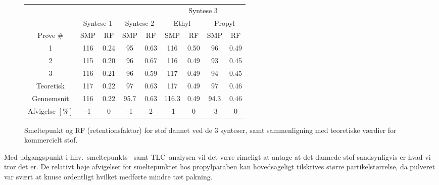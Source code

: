 \documentclass[12pt]{article}
\begin{document}
\begin{figure}[H]\centering
    \caption{Smeltepunkt og RF (retentionsfaktor) for stof dannet ved de 3 synteser, samt sammenligning med teoretiske værdier for kommercielt stof.}
    \begin{tabular*}{\linewidth}{c@{\extracolsep{\fill}}cccccccc}
        \toprule
        & & & & & \multicolumn{4}{c}{Syntese 3} \\
        \cmidrule(r){6-9}
        & \multicolumn{2}{c}{Syntese 1} & \multicolumn{2}{c}{Syntese 2} & \multicolumn{2}{c}{Ethyl} & \multicolumn{2}{c}{Propyl} \\
        \cmidrule(r){2-3} \cmidrule(r){4-5} \cmidrule(r){6-7} \cmidrule(r){8-9}
        Prøve \# & SMP & RF & SMP & RF & SMP & RF & SMP & RF \\
        \midrule
        1 & 116 & 0.24 & 95 & 0.63 & 116 & 0.50 & 96 & 0.49 \\
        2 & 115 & 0.20 & 96 & 0.67 & 116 & 0.49 & 93 & 0.45 \\
        3 & 116 & 0.21 & 96 & 0.59 & 117 & 0.49 & 94 & 0.45 \\
        \midrule
        Teoretisk & 117 & 0.22 & 97 & 0.63 & 117 & 0.49 & 97 & 0.46 \\
        Gennemsnit & 116 & 0.22 & 95.7 & 0.63 & 116.3 & 0.49 & 94.3 & 0.46 \\
        \midrule
        Afvigelse $\left[\si{\%}\right]$ & -1 & 0 & -1 & 2 & -1 & 0 & -3 & 0 \\
        \bottomrule
    \end{tabular*}
\end{figure} \vskip -8pt
Med udgangspunkt i hhv.\ smeltepunkts-- samt TLC--analysen vil det være rimeligt at antage at det dannede stof sandsynligvis er hvad vi tror det er. De relativt høje afvigelser for smeltepunktet hos propylparaben kan hovedsageligt tilskrives større partikelstørrelse, da pulveret var svært at knuse ordentligt hvilket medførte mindre tæt pakning.
\end{document}
